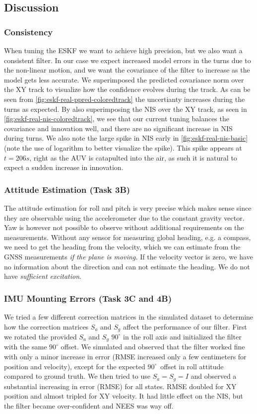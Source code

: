 \subsection{Discussion}


\subsubsection{Consistency}
When tuning the ESKF we want to achieve high precision, but we also want a consistent filter. In our case we expect increased model errors in the turns due to the non-linear motion, and we want the covariance of the filter to increase as the model gets less accurate. We superimposed the predicted covariance norm over the XY track to visualize how the confidence evolves during the track. As can be seen from \cref{fig:eskf-real-ppred-coloredtrack} the uncertianty increases during the turns as expected. By also superimposing the NIS over the XY track, as seen in \cref{fig:eskf-real-nis-coloredtrack}, we see that our current tuning balances the covariance and innovation well, and there are no significant increase in NIS during turns.
We also note the large spike in NIS early in \cref{fig:eskf-real-nis-basic} (note the use of logarithm to better visualize the spike). This spike appears at $t=206s$, right as the AUV is catapulted into the air, as such it is natural to expect a sudden increase in innovation.

\subsubsection{Attitude Estimation (Task 3B)}
The attitude estimation for roll and pitch is very precise which makes sense since they are observable using the accelerometer due to the constant gravity vector. Yaw is however not possible to observe without additional requirements on the measurements. Without any sensor for measuring global heading, e.g. a compass, we need to get the heading from the velocity, which we can estimate from the GNSS measurements \textit{if the plane is moving.} If the velocity vector is zero, we have no information about the direction and can not estimate the heading. We do not have \textit{sufficient excitation}.

\subsubsection{IMU Mounting Errors (Task 3C and 4B)}
We tried a few different correction matrices  in the simulated dataset to determine how the correction matrices $S_a$ and $S_g$ affect the performance of our filter. First we rotated the provided $S_a$ and $S_g$ $90^\circ$ in the roll axis and initialized the filter with the same $90^\circ$ offset. We simulated and observed that the filter worked fine with only a minor increase in error (RMSE increased only a few centimeters for position and velocity), except for the expected $90^\circ$ offset in roll attitude compared to ground truth. We then tried to use $S_a = S_g = I$ and observed a substantial increasing in error (RMSE) for all states. RMSE doubled for XY position and almost tripled for XY velocity. It had little effect on the NIS, but the filter became over-confident and NEES was way off.

